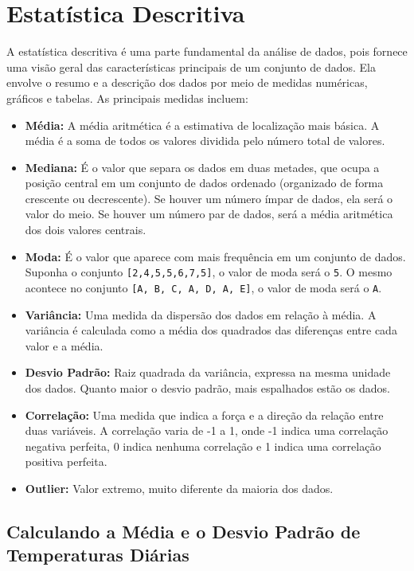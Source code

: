 \documentclass[a4paper,12pt,openany]{book}
\begin{document}
\section{Estatística Descritiva}
A estatística descritiva é uma parte fundamental da análise de dados, pois fornece uma visão geral das características principais de um conjunto de dados.
Ela envolve o resumo e a descrição dos dados por meio de medidas numéricas, gráficos e tabelas. As principais medidas incluem:
\begin{itemize}
    \item \textbf{Média:} A média aritmética é a estimativa de localização mais básica. A média é a  soma de todos os valores dividida pelo número total de valores.
    \item \textbf{Mediana:} É o valor que separa os dados em duas metades, que ocupa a posição central em um conjunto de dados ordenado (organizado de forma crescente ou decrescente). Se houver um número ímpar de dados, ela será o valor do meio. Se houver um número par de dados, será a média aritmética dos dois valores centrais.
    \item \textbf{Moda:} É o valor que aparece com mais frequência em um conjunto de dados.
    Suponha o conjunto \texttt{[2,4,5,5,6,7,5]}, o valor de moda será o \texttt{5}. O mesmo acontece no conjunto \texttt{[A, B, C, A, D, A, E]}, o valor de moda será o \texttt{A}.
    \item \textbf{Variância:} Uma medida da dispersão dos dados em relação à média. A variância é calculada como a média dos quadrados das diferenças entre cada valor e a média.
    \item \textbf{Desvio Padrão:} Raiz quadrada da variância, expressa na mesma unidade dos dados. Quanto maior o desvio padrão, mais espalhados estão os dados.
    \item \textbf{Correlação:} Uma medida que indica a força e a direção da relação entre duas variáveis. A correlação varia de -1 a 1, onde -1 indica uma correlação negativa perfeita, 0 indica nenhuma correlação e 1 indica uma correlação positiva perfeita.
    \item \textbf{Outlier:} Valor extremo, muito diferente da maioria dos dados.
\end{itemize}

\subsection{Calculando a Média e o Desvio Padrão de Temperaturas Diárias}
\end{document}
